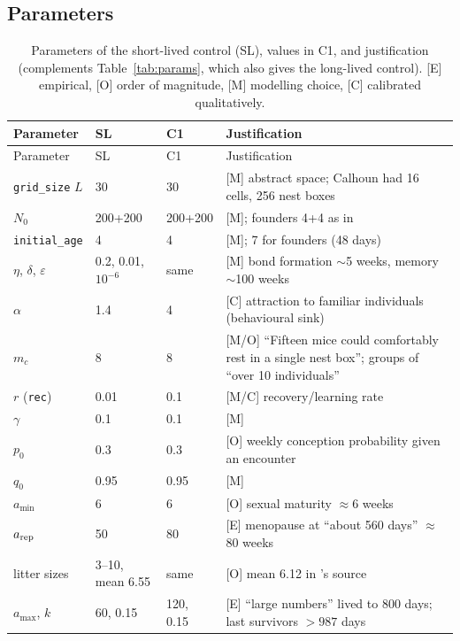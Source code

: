 \subsection{Parameters}
{\small
\begin{longtable}{@{}p{}p{}p{}p{}@{}}
\caption{Parameters of the short-lived control (SL), values in \textsf{C1}, and justification (complements
Table~\ref{tab:params}, which also gives the long-lived control). [E] empirical, [O] order of
magnitude, [M] modelling choice, [C] calibrated qualitatively.}\label{tab:odd-params}\\
\toprule
Parameter & SL & \textsf{C1} & Justification \\
\midrule
\endfirsthead
\toprule
Parameter & SL & \textsf{C1} & Justification \\
\midrule
\endhead
\bottomrule
\endfoot
\texttt{grid\_size} $L$ & 30 & 30 & [M] abstract space; Calhoun had 16 cells, 256 nest boxes \\
$N_0$ & 200+200 & 200+200 & [M]; founders 4+4 as in \cite{Calhoun1973} \\
\texttt{initial\_age} & 4 & 4 & [M]; 7 for founders (48 days) \\
$\eta$, $\delta$, $\varepsilon$ & 0.2, 0.01, $10^{-6}$ & same & [M] bond formation $\sim$5 weeks, memory $\sim$100 weeks \\
$\alpha$ & 1.4 & 4 & [C] attraction to familiar individuals (behavioural sink) \\
$m_c$ & 8 & 8 & [M/O] ``Fifteen mice could comfortably rest in a single nest box''; groups of ``over 10 individuals'' \cite{Calhoun1973} \\
$r$ (\texttt{rec}) & 0.01 & 0.1 & [M/C] recovery/learning rate \\
$\gamma$ & 0.1 & 0.1 & [M] \\
$p_0$ & 0.3 & 0.3 & [O] weekly conception probability given an encounter \\
$q_0$ & 0.95 & 0.95 & [M] \\
$a_{\min}$ & 6 & 6 & [O] sexual maturity $\approx$6 weeks \\
$a_{\rm rep}$ & 50 & 80 & [E] menopause at ``about 560 days'' $\approx$80 weeks \cite{Calhoun1973} \\
litter sizes & 3--10, mean 6.55 & same & [O] mean 6.12 in \cite{GwizdallaDus2026}'s source \\
$a_{\max}$, $k$ & 60, 0.15 & 120, 0.15 & [E] ``large numbers'' lived to 800 days; last survivors $>987$ days \cite{Calhoun1973} \\

\end{longtable}}
